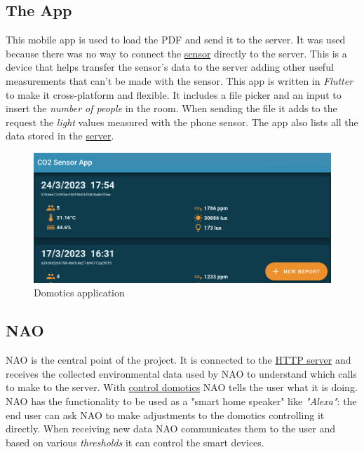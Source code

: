 \documentclass{optica-article}
\begin{document}
\bigskip
\subsection{The App}\label{sec:domotics_app}
\vspace{5pt}
This mobile app is used to load the PDF and send it to the server. It was used because there was no way to connect the \hyperref[sec:domotics_sensor]{sensor} directly to the server. This is a device that helps transfer the sensor's data to the server adding other useful measurements that can't be made with the sensor. This app is written in \emph{Flutter} to make it cross-platform and flexible. It includes a file picker and an input to insert the \emph{number of people} in the room. When sending the file it adds to the request the \emph{light} values measured with the phone sensor. The app also lists all the data stored in the \hyperref[sec:domotics_server]{server}.\\

\begin{figure}[H]
    \centering
    \includegraphics[scale=0.17]{figures/domotics_app.png}
    \caption{Domotics application}
    \label{fig:app_domotica}
\end{figure}


\subsection{NAO}\label{sec:domotics_nao}
NAO is the central point of the project. It is connected to the \hyperref[sec:domotics_server]{HTTP server} and receives the collected environmental data used by NAO to understand which calls to make to the server. With \hyperref[sec:domotics_domotics_server]{control domotics} NAO tells the user what it is doing. NAO has the functionality to be used as a "smart home speaker" like \emph{"Alexa"}: the end user can ask NAO to make adjustments to the domotics controlling it directly. When receiving new data NAO communicates them to the user and based on various \emph{thresholds} it can control the smart devices.
\end{document}
